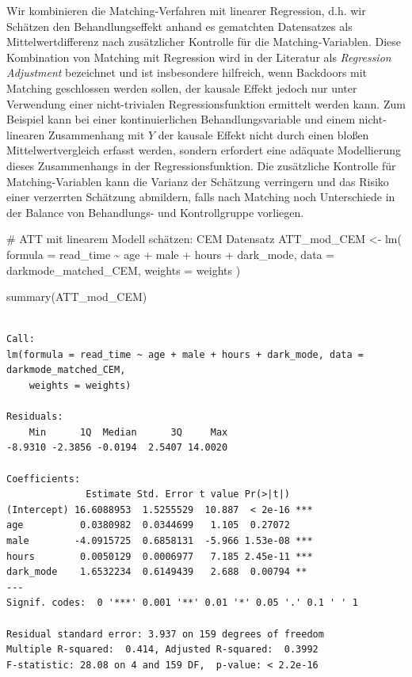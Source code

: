 \documentclass[
  a4paper,
  DIV=11,
  oneside]{scrreprt}
\newenvironment{Shaded}{\begin{snugshade}}{\end{snugshade}}
\newcommand{\AttributeTok}[1]{\textcolor[rgb]{0.40,0.45,0.13}{#1}}
\newcommand{\CommentTok}[1]{\textcolor[rgb]{0.37,0.37,0.37}{#1}}
\newcommand{\FunctionTok}[1]{\textcolor[rgb]{0.28,0.35,0.67}{#1}}
\newcommand{\NormalTok}[1]{\textcolor[rgb]{0.00,0.23,0.31}{#1}}
\newcommand{\OtherTok}[1]{\textcolor[rgb]{0.00,0.23,0.31}{#1}}
\newcommand{\SpecialCharTok}[1]{\textcolor[rgb]{0.37,0.37,0.37}{#1}}
\begin{document}
Wir kombinieren die Matching-Verfahren mit linearer Regression, d.h. wir
Schätzen den Behandlungseffekt anhand es gematchten Datensatzes als
Mittelwertdifferenz nach zusätzlicher Kontrolle für die
Matching-Variablen. Diese Kombination von Matching mit Regression wird
in der Literatur als \emph{Regression Adjustment} bezeichnet und ist
insbesondere hilfreich, wenn Backdoors mit Matching geschlossen werden
sollen, der kausale Effekt jedoch nur unter Verwendung einer
nicht-trivialen Regressionsfunktion ermittelt werden kann. Zum Beispiel
kann bei einer kontinuierlichen Behandlungsvariable und einem
nicht-linearen Zusammenhang mit \(Y\) der kausale Effekt nicht durch
einen bloßen Mittelwertvergleich erfasst werden, sondern erfordert eine
adäquate Modellierung dieses Zusammenhangs in der Regressionsfunktion.
Die zusätzliche Kontrolle für Matching-Variablen kann die Varianz der
Schätzung verringern und das Risiko einer verzerrten Schätzung
abmildern, falls nach Matching noch Unterschiede in der Balance von
Behandlungs- und Kontrollgruppe vorliegen.

\begin{Shaded}
\begin{Highlighting}[]
\CommentTok{\# ATT mit linearem Modell schätzen: CEM Datensatz}
\NormalTok{ATT\_mod\_CEM }\OtherTok{\textless{}{-}} \FunctionTok{lm}\NormalTok{(}
  \AttributeTok{formula =}\NormalTok{ read\_time }\SpecialCharTok{\textasciitilde{}}\NormalTok{ age }\SpecialCharTok{+}\NormalTok{ male }\SpecialCharTok{+}\NormalTok{ hours }\SpecialCharTok{+}\NormalTok{ dark\_mode,}
  \AttributeTok{data =}\NormalTok{ darkmode\_matched\_CEM, }
  \AttributeTok{weights =}\NormalTok{ weights }
\NormalTok{)}

\FunctionTok{summary}\NormalTok{(ATT\_mod\_CEM)}
\end{Highlighting}
\end{Shaded}

\begin{verbatim}

Call:
lm(formula = read_time ~ age + male + hours + dark_mode, data = darkmode_matched_CEM, 
    weights = weights)

Residuals:
    Min      1Q  Median      3Q     Max 
-8.9310 -2.3856 -0.0194  2.5407 14.0020 

Coefficients:
              Estimate Std. Error t value Pr(>|t|)    
(Intercept) 16.6088953  1.5255529  10.887  < 2e-16 ***
age          0.0380982  0.0344699   1.105  0.27072    
male        -4.0915725  0.6858131  -5.966 1.53e-08 ***
hours        0.0050129  0.0006977   7.185 2.45e-11 ***
dark_mode    1.6532234  0.6149439   2.688  0.00794 ** 
---
Signif. codes:  0 '***' 0.001 '**' 0.01 '*' 0.05 '.' 0.1 ' ' 1

Residual standard error: 3.937 on 159 degrees of freedom
Multiple R-squared:  0.414, Adjusted R-squared:  0.3992 
F-statistic: 28.08 on 4 and 159 DF,  p-value: < 2.2e-16
\end{verbatim}
\end{document}
